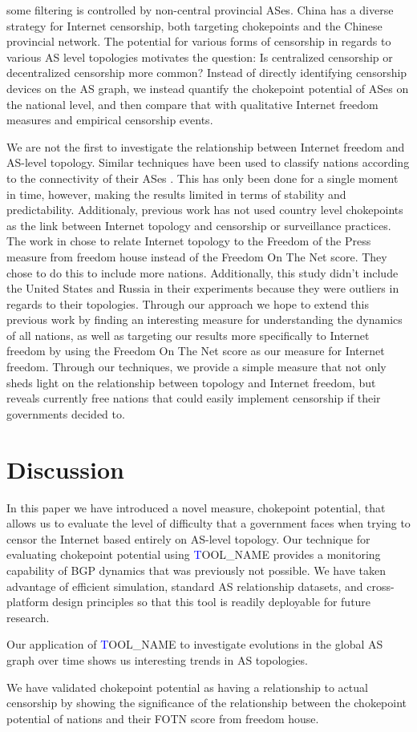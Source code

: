 \documentclass[10pt, conference, letterpaper]{IEEEtran}
\newcommand{\toolname}{{\textcolor{blue}TOOL\_NAME }}
\begin{document}
some filtering is controlled by non-central provincial ASes. China has a
diverse strategy for Internet censorship, both targeting chokepoints and the
Chinese provincial network. The potential for various forms of censorship in
regards to various AS level topologies motivates the question: Is centralized
censorship or decentralized censorship more common? Instead of directly
identifying censorship devices on the AS graph, we instead quantify the
chokepoint potential of ASes on the national level, and then compare that with
qualitative Internet freedom measures and empirical censorship events.
\par
We are not the first to investigate the relationship between Internet freedom and
AS-level topology. Similar techniques have been used to classify nations according
to the connectivity of their ASes \cite{politicsrouting}. This has only been done for a
single moment in time, however, making the results limited in terms of stability and predictability.
Additionaly, previous work has not used country level chokepoints as the link between Internet topology
and censorship or surveillance practices. The work in \cite{politicsrouting} chose to relate Internet topology
to the Freedom of the Press measure from freedom house instead of the Freedom On The Net score. They chose to do this
to include more nations. Additionally, this study didn't include the United States and Russia in their experiments because they were
outliers in regards to their topologies. Through our approach we hope to extend this previous work by finding an interesting measure for
understanding the dynamics of all nations, as well as targeting our results more specifically to Internet freedom by using the Freedom On
The Net score as our measure for Internet freedom. Through our techniques, we provide a simple measure that not only 
sheds light on the relationship between topology and Internet freedom, but reveals currently free
nations that could easily implement censorship if their governments decided to.


\section{Discussion}

In this paper we have introduced a novel measure, chokepoint potential, that allows us to
evaluate the level of difficulty that a government faces when trying to censor the Internet
based entirely on AS-level topology. Our technique for evaluating chokepoint potential using
\toolname provides a monitoring capability of BGP dynamics that was previously not possible.
We have taken advantage of efficient simulation, standard AS relationship datasets, and cross-platform
design principles so that this tool is readily deployable for future research.
\par
Our application of \toolname to investigate evolutions in the global AS graph over time shows us
interesting trends in AS topologies.
\par
We have validated chokepoint potential as having a relationship to actual censorship by showing
the significance of the relationship between the chokepoint potential of nations and their FOTN
score from freedom house.
\end{document}
